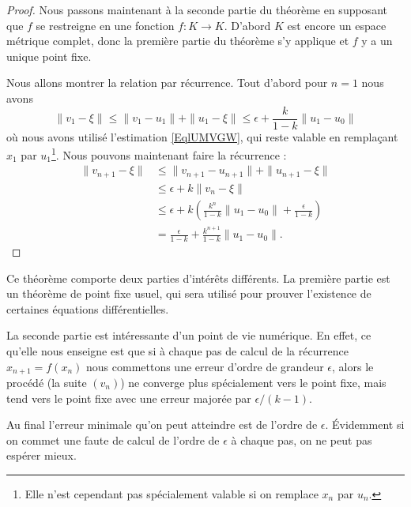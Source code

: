 \begin{proof}
    Nous passons maintenant à la seconde partie du théorème en supposant que \( f\) se restreigne en une fonction \( f\colon K\to K\). D'abord \( K\) est encore un espace métrique complet, donc la première partie du théorème s'y applique et \( f\) y a un unique point fixe.

    Nous allons montrer la relation par récurrence. Tout d'abord pour \( n=1\) nous avons
    \begin{equation}
        \| v_1-\xi \|\leq\| v_1-u_1 \|+\| u_1-\xi \|\leq \epsilon+\frac{ k }{ 1-k }\| u_1-u_0 \|
    \end{equation}
    où nous avons utilisé l'estimation \eqref{EqlUMVGW}, qui reste valable en remplaçant \( x_1\) par \( u_1\)\footnote{Elle n'est cependant pas spécialement valable si on remplace \( x_n\) par \( u_n\).}. Nous pouvons maintenant faire la récurrence :
    \begin{subequations}
        \begin{align}
            \| v_{n+1}-\xi \|&\leq \| v_{n+1}-u_{n+1} \|+\| u_{n+1}-\xi \|\\
            &\leq \epsilon+k\| v_n-\xi \|\\
            &\leq \epsilon+k\left( \frac{ k^n }{ 1-k }\| u_1-u_0 \|+\frac{ \epsilon }{ 1-k } \right)\\
            &=\frac{ \epsilon }{ 1-k }+\frac{ k^{n+1} }{ 1-k }\| u_1-u_0 \|.
        \end{align}
    \end{subequations}
\end{proof}

\begin{remark}
    Ce théorème comporte deux parties d'intérêts différents. La première partie est un théorème de point fixe usuel, qui sera utilisé pour prouver l'existence de certaines équations différentielles.

    La seconde partie est intéressante d'un point de vie numérique. En effet, ce qu'elle nous enseigne est que si à chaque pas de calcul de la récurrence \( x_{n+1}=f(x_n)\) nous commettons une erreur d'ordre de grandeur \( \epsilon\), alors le procédé (la suite \( (v_n)\)) ne converge plus spécialement vers le point fixe, mais tend vers le point fixe avec une erreur majorée par \( \epsilon/(k-1)\).
\end{remark}

\begin{remark}
Au final l'erreur minimale qu'on peut atteindre est de l'ordre de \( \epsilon\). Évidemment si on commet une faute de calcul de l'ordre de \( \epsilon\) à chaque pas, on ne peut pas espérer mieux.
\end{remark}


